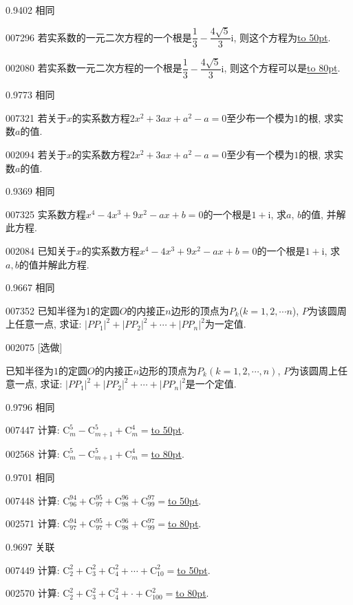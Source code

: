\documentclass[10pt,a4paper]{article}
\newcommand{\blank}[1]{\underline{\hbox to #1pt{}}}
\begin{document}
0.9402 相同

007296	若实系数的一元二次方程的一个根是$\dfrac 13-\dfrac{4\sqrt 5}3\mathrm{i}$, 则这个方程为\blank{50}.

002080	若实系数一元二次方程的一个根是$\dfrac{1}{3}-\dfrac{4\sqrt{5}}{3}\mathrm{i}$, 则这个方程可以是\blank{80}.



0.9773 相同

007321	若关于$x$的实系数方程$2x^2+3ax+a^2-a=0$至少布一个模为1的根, 求实数$a$的值.

002094	若关于$x$的实系数方程$2x^2+3ax+a^2-a=0$至少有一个模为$1$的根, 求实数$a$的值.



0.9369 相同

007325	实系数方程$x^4-4x^3+9x^2-ax+b=0$的一个根是$1+\mathrm{i}$, 求$a$, $b$的值, 并解此方程.

002084	已知关于$x$的实系数方程$x^4-4x^3+9x^2-ax+b=0$的一个根是$1+\mathrm{i}$, 求$a,b$的值并解此方程.



0.9667 相同

007352	已知半径为1的定圆$O$的内接正$n$边形的顶点为$P_k$($k=1,2,\cdots n$), $P$为该圆周上任意一点, 求证: $|PP_1|^2+|PP_2|^2+\cdots +|PP_n|^2$为一定值.

002075	[选做]

已知半径为$1$的定圆$O$的内接正$n$边形的顶点为$P_k(k=1,2,\cdots,n)$, $P$为该圆周上任意一点, 求证: $|PP_1|^2+|PP_2|^2+\cdots+|PP_n|^2$是一个定值.



0.9796 相同

007447	计算: $\mathrm{C}_m^5-\mathrm{C}_{m+1}^5+\mathrm{C}_m^4=$\blank{50}.

002568	计算: $\mathrm{C}_m^5-\mathrm{C}_{m+1}^5+\mathrm{C}_m^4=$\blank{80}.



0.9701 相同

007448	计算: $\mathrm{C}_{96}^{94}+\mathrm{C}_{97}^{95}+\mathrm{C}_{98}^{96}+\mathrm{C}_{99}^{97}=$\blank{50}.

002571	计算: $\mathrm{C}_{97}^{94}+\mathrm{C}_{97}^{95}+\mathrm{C}_{98}^{96}+\mathrm{C}_{99}^{97}=$\blank{80}.



0.9697 关联

007449	计算: $\mathrm{C}_2^2+\mathrm{C}_3^2+\mathrm{C}_4^2+\cdots +\mathrm{C}_{10}^2=$\blank{50}.

002570	计算: $\mathrm{C}_2^2+\mathrm{C}_3^2+\mathrm{C}_4^2+\cdot+\mathrm{C}_{100}^2=$\blank{80}.
\end{document}
